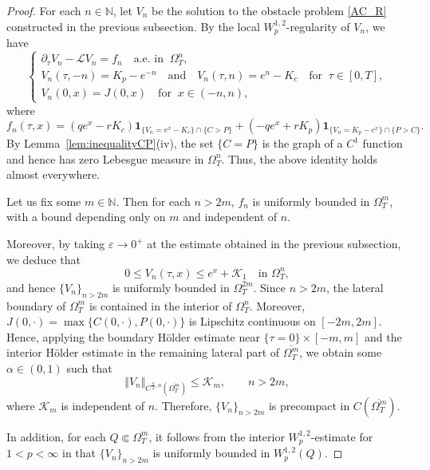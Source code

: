 \documentclass[11pt, a4paper, leqno]{amsart}
\numberwithin{equation}{section}
\theoremstyle{plain}
\theoremstyle{definition}
\theoremstyle{remark}
\def\leq{\leqslant}
\begin{document}
\begin{proof}
For each $n\in\mathbb{N}$, 
let $V_n$ be the solution to the obstacle problem \eqref{AC_R}
constructed in the previous subsection.
By the {local} $W^{1,2}_p$-regularity of $V_n$, we have
\begin{equation*}
    \begin{cases}
    \partial_\tau V_n-\mathcal{L}V_n=f_n
    \quad \text{a.e. in }\ \Omega_T^n,\\
    {
    V_n(\tau,-n)=K_p-e^{-n} \quad \text{and} \quad
    V_n(\tau,n)=e^n-K_c
    \quad  \text{for }\ \tau \in [0,T],
    }\\
    V_n(0,x)={ J(0,x)} \quad \text{for }\ x\in(-n,n),
    \end{cases}
\end{equation*}
where 
\[
f_n(\tau,x)=
(qe^x-rK_c) \mathbf{1}_{\{V_n=e^x-K_c \}\cap \{C>P \}}
+(-qe^x+rK_p) \mathbf{1}_{\{V_n=K_p-e^x \}\cap \{P>C\}}.
\]
{
By Lemma~\ref{lem:inequalityCP}(iv), the set $\{C=P\}$ is the graph
of a $C^1$ function and hence has zero Lebesgue measure in
$\Omega_T^n$. Thus, the above identity holds almost everywhere.
}

Let us fix some $m\in\mathbb{N}$. Then for each $n>2m$,
$f_n$ is uniformly bounded in $\Omega_T^m$,
with a bound depending only on $m$ and independent of $n$.
{
Moreover, by taking $\varepsilon\to 0^+$ at the estimate obtained in the previous subsection, we deduce that
\[
    0\leq V_n(\tau,x)\leq e^x+\mathcal K_1
    \quad\text{in }\Omega_T^n,
\]
and hence $\{V_n\}_{n>2m}$ is uniformly bounded in
$\Omega_T^{2m}$.
Since $n>2m$, the lateral boundary of $\Omega_T^m$ is contained in
the interior of $\Omega_T^n$. Moreover,
$J(0,\cdot)=\max\{C(0,\cdot),P(0,\cdot)\}$ is Lipschitz continuous on
$[-2m,2m]$. Hence, applying the boundary H\"older estimate
\cite[Theorem~6.33]{LIE96} near $\{\tau=0\}\times[-m,m]$ and the
interior H\"older estimate in the remaining lateral part of
$\overline{\Omega_T^m}$, we obtain some $\alpha\in(0,1)$ such that
\[
    \Vert V_n\Vert_
    {C^{\frac{\alpha}{2},\alpha}(\overline{\Omega_T^m})}
    \leq \mathcal K_m,
    \qquad n>2m,
\]
where $\mathcal K_m$ is independent of $n$.
Therefore, $\{V_n\}_{n>2m}$ is precompact in
$C(\overline{\Omega_T^m})$.

In addition, for each $Q\Subset\Omega_T^m$, it follows from the
interior $W^{1,2}_p$-estimate for $1<p<\infty$ in
\cite[p.~355]{LSU68} that $\{V_n\}_{n>2m}$ is uniformly bounded in
$W^{1,2}_p(Q)$.
}


\end{proof}
\end{document}
